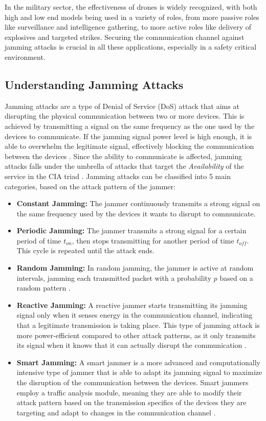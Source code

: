 \documentclass[futureinternet,article,submit,pdftex,moreauthors]{Definitions/mdpi}
\begin{document}
In the military sector, the effectiveness of drones is widely recognized, with both high and low end models being used in a variety of roles, from more passive roles like surveillance and intelligence gathering, to more active roles like
delivery of explosives and targeted strikes. Securing the communication channel against jamming attacks is crucial in all these applications, especially in a safety critical environment. 

\subsection{Understanding Jamming Attacks}

Jamming attacks are a type of Denial of Service (DoS) attack that aims at disrupting the physical communication between two or more devices. 
This is achieved by transmitting a signal on the same frequency as the one used by the devices to communicate. If the jamming signal power level is high enough, 
it is able to overwhelm the legitimate signal, effectively blocking the communication between the devices \cite{DroneCommHassija}. 
Since the ability to communicate is affected, jamming attacks falls under the umbrella of attacks that target the \textit{Availability} of the service in the CIA triad \cite{DataIntegrityCawthra}. 
Jamming attacks can be classified into 5 main categories, based on the attack pattern of the jammer: 

\begin{itemize}
    \item \textbf{Constant Jamming:} The jammer continuously transmits a strong signal on the same frequency used by the devices it wants to disrupt to communicate. 
    \item \textbf{Periodic Jamming:} The jammer transmits a strong signal for a certain period of time \(t_{on}\), then stops transmitting for another period of time \(t_{off}\). This cycle is repeated until the attack ends.
    \item \textbf{Random Jamming:} In random jamming, the jammer is active at random intervals, jamming each transmitted packet with a probability 
    \(p\) based on a random pattern \cite{VANETsAI-Lyamin}. 
    \item \textbf{Reactive Jamming:} A reactive jammer starts transmitting its jamming signal only when it senses energy in the communication channel, 
    indicating that a legitimate transmission is taking place. This type of jamming attack is more power-efficient compared to other 
    attack patterns, as it only transmits its signal when it knows that it can actually disrupt the communication \cite{MLMisbehavior5GBoualouache}.
    \item \textbf{Smart Jamming:} A smart jammer is a more advanced and computationally intensive type of jammer that is able to adapt its jamming signal to 
    maximize the disruption of the communication between the devices. Smart jammers employ a traffic analysis module, meaning they are able to modify their attack pattern based on the 
    transmission specifics of the devices they are targeting and adapt to changes in the communication channel \cite{AntiJammingV2V-Feng}. 
\end{itemize}
\end{document}
